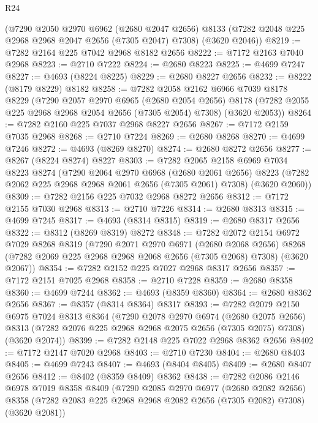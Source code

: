 \begin{lexlean}{R24}
\begin{coremodule}
    (@7290
      @2050
      @2970
      @6962
      (@2680 @2047 @2656)
      @8133
      (@7282 @2048 @225 @2968 @2968 @2047 @2656 (@7305 @2047) @7308)
      (@3620 @2046))
@8219 := @7282 @2164 @225 @7042 @2968 @8182 @2656
@8222 := @7172 @2163 @7040 @2968
@8223 := @2710 @7222
@8224 := @2680 @8223
@8225 := @4699 @7247
@8227 := @4693 (@8224 @8225)
@8229 := @2680 @8227 @2656
@8232 := @8222 (@8179 @8229) @8182
@8258 := @7282
    @2058
    @2162
    @6966
    @7039
    @8178
    @8229
    (@7290
      @2057
      @2970
      @6965
      (@2680 @2054 @2656)
      @8178
      (@7282 @2055 @225 @2968 @2968 @2054 @2656 (@7305 @2054) @7308)
      (@3620 @2053))
@8264 := @7282 @2160 @225 @7037 @2968 @8227 @2656
@8267 := @7172 @2159 @7035 @2968
@8268 := @2710 @7224
@8269 := @2680 @8268
@8270 := @4699 @7246
@8272 := @4693 (@8269 @8270)
@8274 := @2680 @8272 @2656
@8277 := @8267 (@8224 @8274) @8227
@8303 := @7282
    @2065
    @2158
    @6969
    @7034
    @8223
    @8274
    (@7290
      @2064
      @2970
      @6968
      (@2680 @2061 @2656)
      @8223
      (@7282 @2062 @225 @2968 @2968 @2061 @2656 (@7305 @2061) @7308)
      (@3620 @2060))
@8309 := @7282 @2156 @225 @7032 @2968 @8272 @2656
@8312 := @7172 @2155 @7030 @2968
@8313 := @2710 @7226
@8314 := @2680 @8313
@8315 := @4699 @7245
@8317 := @4693 (@8314 @8315)
@8319 := @2680 @8317 @2656
@8322 := @8312 (@8269 @8319) @8272
@8348 := @7282
    @2072
    @2154
    @6972
    @7029
    @8268
    @8319
    (@7290
      @2071
      @2970
      @6971
      (@2680 @2068 @2656)
      @8268
      (@7282 @2069 @225 @2968 @2968 @2068 @2656 (@7305 @2068) @7308)
      (@3620 @2067))
@8354 := @7282 @2152 @225 @7027 @2968 @8317 @2656
@8357 := @7172 @2151 @7025 @2968
@8358 := @2710 @7228
@8359 := @2680 @8358
@8360 := @4699 @7244
@8362 := @4693 (@8359 @8360)
@8364 := @2680 @8362 @2656
@8367 := @8357 (@8314 @8364) @8317
@8393 := @7282
    @2079
    @2150
    @6975
    @7024
    @8313
    @8364
    (@7290
      @2078
      @2970
      @6974
      (@2680 @2075 @2656)
      @8313
      (@7282 @2076 @225 @2968 @2968 @2075 @2656 (@7305 @2075) @7308)
      (@3620 @2074))
@8399 := @7282 @2148 @225 @7022 @2968 @8362 @2656
@8402 := @7172 @2147 @7020 @2968
@8403 := @2710 @7230
@8404 := @2680 @8403
@8405 := @4699 @7243
@8407 := @4693 (@8404 @8405)
@8409 := @2680 @8407 @2656
@8412 := @8402 (@8359 @8409) @8362
@8438 := @7282
    @2086
    @2146
    @6978
    @7019
    @8358
    @8409
    (@7290
      @2085
      @2970
      @6977
      (@2680 @2082 @2656)
      @8358
      (@7282 @2083 @225 @2968 @2968 @2082 @2656 (@7305 @2082) @7308)
      (@3620 @2081))

\end{coremodule}
\end{lexlean}

